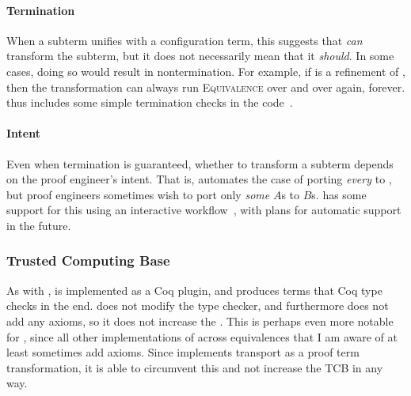 \paragraph{Termination}
When a subterm unifies with a configuration term, this suggests that \toolnamec \textit{can}
transform the subterm, but it does not necessarily mean that it \textit{should}.
In some cases, doing so would result in nontermination.
For example, if \B is a refinement of \Aa, then the transformation can always run \textsc{Equivalence}
over and over again, forever.
\toolnamec thus includes some simple termination checks in the code~\href{https://github.com/uwplse/pumpkin-pi/blob/v2.0.0/plugin/src/automation/lift/liftrules.ml}{}. %

\paragraph{Intent}
Even when termination is guaranteed, whether to transform a subterm depends on the proof engineer's intent.
That is, \toolnamec automates the case of porting \textit{every} \Aa to \B,
but proof engineers sometimes wish to port only \textit{some} $A$s to $B$s.
\toolnamec has some support for this using an interactive workflow~\href{https://github.com/uwplse/pumpkin-pi/blob/v2.0.0/plugin/coq/minimal_records.v}{},
with plans for automatic support in the future. %

\subsubsection{Trusted Computing Base}
\label{sec:pi-tcb}

As with \sysname, \toolnamec is implemented as a Coq plugin, and produces terms that Coq type checks in the end.
\toolnamec does not modify the type checker, and furthermore does not add any axioms, so it does not increase the .
This is perhaps even more notable for \toolnamec, since all other implementations of  across equivalences
that I am aware of at least sometimes add axioms.
Since \toolnamec implements transport as a proof term transformation, it is able to circumvent this and not increase the TCB in any way.

